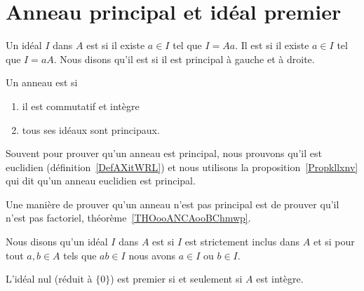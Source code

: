 \section{Anneau principal et idéal premier}

\begin{definition}      \label{DEFooMZRKooBPLAWH}
	Un idéal \( I\) dans \( A\) est  si il existe \( a\in I\) tel que \( I= A a\). Il est  si il existe \( a\in I\) tel que \( I=a A\). Nous disons qu'il est  si il est principal à gauche et à droite.
\end{definition}

\begin{definition}          \label{DEFooGWOZooXzUlhK}
	Un anneau est  si
	\begin{enumerate}
		\item
		      il est commutatif et intègre
		\item
		      tous ses idéaux sont principaux.
	\end{enumerate}
\end{definition}

Souvent pour prouver qu'un anneau est principal, nous prouvons qu'il est euclidien (définition~\ref{DefAXitWRL}) et nous utilisons la proposition~\ref{Propkllxnv} qui dit qu'un anneau euclidien est principal.

Une manière de prouver qu'un anneau n'est pas principal est de prouver qu'il n'est pas factoriel, théorème~\ref{THOooANCAooBChmwp}.

\begin{definition}      \label{DEFooAQSZooVhvQWv}
	Nous disons qu'un idéal \( I\) dans \( A\) est  si \( I\) est strictement inclus dans \( A\) et si pour tout \( a,b\in A\) tels que \( ab\in I\) nous avons \( a\in I\) ou \( b\in I\).
\end{definition}

\begin{lemma}       \label{LEMooYRPBooYxXXsi}
	L'idéal nul (réduit à \( \{ 0 \}\)) est premier si et seulement si \( A\) est intègre.
\end{lemma}

